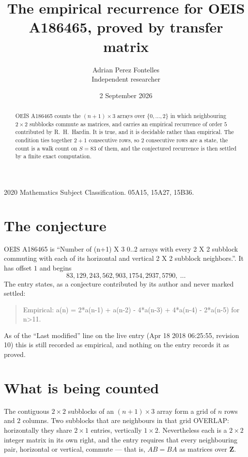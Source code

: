 \documentclass[11pt,a4paper]{article}
\title{The empirical recurrence for OEIS A186465, proved by transfer matrix}
\author{Adrian Perez Fontelles\\ \small Independent researcher}
\date{2 September 2026}
\theoremstyle{plain}
\theoremstyle{definition}
\begin{document}
\maketitle

\begin{abstract}
OEIS A186465 counts the $(n+1)\times3$ arrays over $\{0,\dots,2\}$ in which
neighbouring $2\times2$ subblocks commute as matrices, and carries an empirical recurrence
of order $5$ contributed by R.~H.~Hardin. It is true, and it is decidable rather than
empirical. The condition ties together $2+1$ consecutive rows, so $2$ consecutive rows are
a state, the count is a walk count on $S=83$ of them, and the conjectured recurrence is then
settled by a finite exact computation.
\end{abstract}

\noindent\small 2020 Mathematics Subject Classification. 05A15, 15A27, 15B36.\normalsize

\section{The conjecture}

OEIS A186465 is ``Number of (n+1) X 3 0..2 arrays with every 2 X 2 subblock commuting with each of its horizontal and vertical 2 X 2 subblock neighbors.''. It has offset $1$ and begins
\[
83, 129, 243, 562, 903, 1754, 2937, 5790,\ \dots
\]
The entry states, as a conjecture contributed by its author and never marked settled:
\begin{quote}
Empirical: a(n) = 2*a(n-1) + a(n-2) - 4*a(n-3) + 4*a(n-4) - 2*a(n-5) for n>11.
\end{quote}
As of the ``Last modified'' line on the live entry (Apr 18 2018 06:25:55, revision 10) this is still
recorded as empirical, and nothing on the entry records it as proved.

\section{What is being counted}

The contiguous $2\times2$ subblocks of an $(n+1)\times3$ array form a grid of $n$
rows and $2$ columns. Two subblocks that are neighbours in that
grid OVERLAP: horizontally they share $2\times1$ entries, vertically
$1\times2$. Nevertheless each is a $2\times2$ integer matrix in its own right, and
the entry requires that every neighbouring pair, horizontal or vertical, commute --- that is,
$AB=BA$ as matrices over $\mathbf{Z}$.
\end{document}
